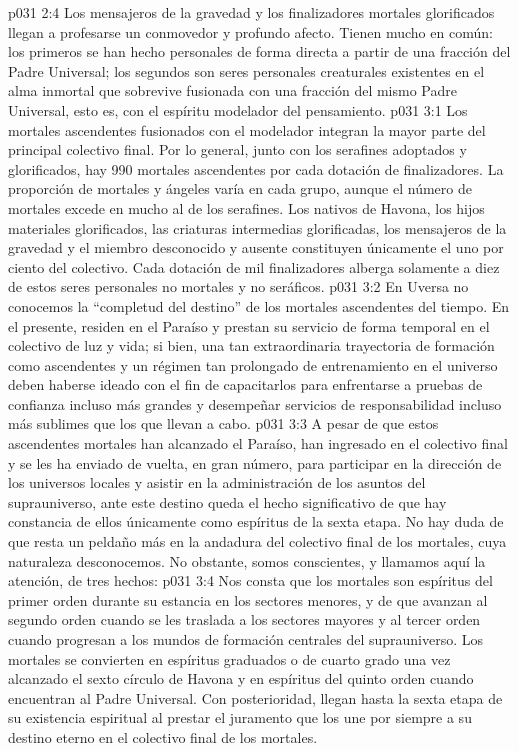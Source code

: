 \vs p031 2:4 Los mensajeros de la gravedad y los finalizadores mortales glorificados llegan a profesarse un conmovedor y profundo afecto. Tienen mucho en común: los primeros se han hecho personales de forma directa a partir de una fracción del Padre Universal; los segundos son seres personales creaturales existentes en el alma inmortal que sobrevive fusionada con una fracción del mismo Padre Universal, esto es, con el espíritu modelador del pensamiento.
\vs p031 3:1 Los mortales ascendentes fusionados con el modelador integran la mayor parte del principal colectivo final. Por lo general, junto con los serafines adoptados y glorificados, hay 990 mortales ascendentes por cada dotación de finalizadores. La proporción de mortales y ángeles varía en cada grupo, aunque el número de mortales excede en mucho al de los serafines. Los nativos de Havona, los hijos materiales glorificados, las criaturas intermedias glorificadas, los mensajeros de la gravedad y el miembro desconocido y ausente constituyen únicamente el uno por ciento del colectivo. Cada dotación de mil finalizadores alberga solamente a diez de estos seres personales no mortales y no seráficos.
\vs p031 3:2 En Uversa no conocemos la “completud del destino” de los mortales ascendentes del tiempo. En el presente, residen en el Paraíso y prestan su servicio de forma temporal en el colectivo de luz y vida; si bien, una tan extraordinaria trayectoria de formación como ascendentes y un régimen tan prolongado de entrenamiento en el universo deben haberse ideado con el fin de capacitarlos para enfrentarse a pruebas de confianza incluso más grandes y desempeñar servicios de responsabilidad incluso más sublimes que los que llevan a cabo.
\vs p031 3:3 \pc A pesar de que estos ascendentes mortales han alcanzado el Paraíso, han ingresado en el colectivo final y se les ha enviado de vuelta, en gran número, para participar en la dirección de los universos locales y asistir en la administración de los asuntos del suprauniverso, ante este destino  queda el hecho significativo de que hay constancia de ellos únicamente como espíritus de la sexta etapa. No hay duda de que resta un peldaño más en la andadura del colectivo final de los mortales, cuya naturaleza desconocemos. No obstante, somos conscientes, y llamamos aquí la atención, de tres hechos:
\vs p031 3:4 Nos consta que los mortales son espíritus del primer orden durante su estancia en los sectores menores, y de que avanzan al segundo orden cuando se les traslada a los sectores mayores y al tercer orden cuando progresan a los mundos de formación centrales del suprauniverso. Los mortales se convierten en espíritus graduados o de cuarto grado una vez alcanzado el sexto círculo de Havona y en espíritus del quinto orden cuando encuentran al Padre Universal. Con posterioridad, llegan hasta la sexta etapa de su existencia espiritual al prestar el juramento que los une por siempre a su destino eterno en el colectivo final de los mortales.
